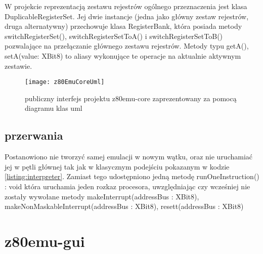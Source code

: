 	W projekcie reprezentacją zestawu rejestrów ogólnego przeznaczenia jest klasa DuplicableRegisterSet. Jej dwie instancje (jedna jako główny zestaw rejestrów, druga alternatywny) przechowuje klasa RegisterBank, która posiada metody switchRegisterSet(), switchRegisterSetToA() i switchRegisterSetToB() pozwalające na przełączanie głównego zestawu rejestrów. Metody typu getA(), setA(value: XBit8) to aliasy wykonujące te operacje na aktualnie aktywnym zestawie. 
	
		
	
	\begin{figure}[h]
		\centering
		\texttt{[image: z80EmuCoreUml]}
		\caption{publiczny interfejs projektu z80emu-core zaprezentowany za pomocą diagramu klas uml}
		\label{img:z80emuCoreUml}
	\end{figure}
	
	\subsection{przerwania}
	
	Postanowiono nie tworzyć samej emulacji w nowym wątku, oraz nie uruchamiać jej w pętli głównej tak jak w klasycznym podejściu pokazanym w kodzie \ref{listing:interpreter}. Zamiast tego udostępniono jedną metodę runOneInstruction() : void która uruchamia jeden rozkaz procesora, uwzględniając czy wcześniej nie zostały wywołane metody makeInterrupt(addressBus : XBit8), makeNonMaskableInterrupt(addressBus : XBit8), resett(addressBus : XBit8)
	
	
	\section{z80emu-gui}
	
	